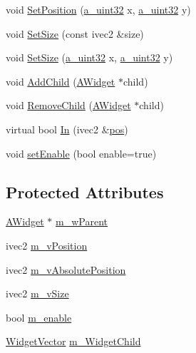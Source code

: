 \begin{DoxyCompactItemize}
\item 
void \hyperlink{class_agmd_1_1_a_widget_abc9afe855a9e356d8b22b4959b4501d4}{Set\+Position} (\hyperlink{_common_defines_8h_a964296f9770051b9e4807b1f180dd416}{a\+\_\+uint32} x, \hyperlink{_common_defines_8h_a964296f9770051b9e4807b1f180dd416}{a\+\_\+uint32} y)
\item 
void \hyperlink{class_agmd_1_1_a_widget_a607875daab03a397bc8c56e0b9a7b05d}{Set\+Size} (const ivec2 \&size)
\item 
void \hyperlink{class_agmd_1_1_a_widget_a7599bd3aed06c6a87a6366dca1180157}{Set\+Size} (\hyperlink{_common_defines_8h_a964296f9770051b9e4807b1f180dd416}{a\+\_\+uint32} x, \hyperlink{_common_defines_8h_a964296f9770051b9e4807b1f180dd416}{a\+\_\+uint32} y)
\item 
void \hyperlink{class_agmd_1_1_a_widget_a558d87b5f1a21cd024f64ae5614eaa5b}{Add\+Child} (\hyperlink{class_agmd_1_1_a_widget}{A\+Widget} $\ast$child)
\item 
void \hyperlink{class_agmd_1_1_a_widget_afcdc701a93e19e28fdd2bb8eaf247f3f}{Remove\+Child} (\hyperlink{class_agmd_1_1_a_widget}{A\+Widget} $\ast$child)
\item 
virtual bool \hyperlink{class_agmd_1_1_a_widget_a277347e1b69a4b0bf9b533712839c175}{In} (ivec2 \&\hyperlink{_examples_2_planet_2_app_8cpp_aa8a1c0491559faca4ebd0881575ae7f0}{pos})
\item 
void \hyperlink{class_agmd_1_1_a_widget_a553dae5fc9aa4acb0f8a030514bcc539}{set\+Enable} (bool enable=true)
\end{DoxyCompactItemize}
\subsection*{Protected Attributes}
\begin{DoxyCompactItemize}
\item 
\hyperlink{class_agmd_1_1_a_widget}{A\+Widget} $\ast$ \hyperlink{class_agmd_1_1_a_widget_aa2f111deaa61119d5ca22ebfe3ffde0b}{m\+\_\+w\+Parent}
\item 
ivec2 \hyperlink{class_agmd_1_1_a_widget_a4e3374bad24df72fa15c5286ff154069}{m\+\_\+v\+Position}
\item 
ivec2 \hyperlink{class_agmd_1_1_a_widget_a7bd2aab552f0e6a5ec69e370d7036bc5}{m\+\_\+v\+Absolute\+Position}
\item 
ivec2 \hyperlink{class_agmd_1_1_a_widget_a9edc06412e2a259d443e1b8ccfc734c6}{m\+\_\+v\+Size}
\item 
bool \hyperlink{class_agmd_1_1_a_widget_ac2374dfc985006a232a96c5d777820d4}{m\+\_\+enable}
\item 
\hyperlink{namespace_agmd_aef7baa69b34272786cd1f8690ca0071e}{Widget\+Vector} \hyperlink{class_agmd_1_1_a_widget_ac337e837ab1cdbad366d3c2cb2d53294}{m\+\_\+\+Widget\+Child}
\end{DoxyCompactItemize}
